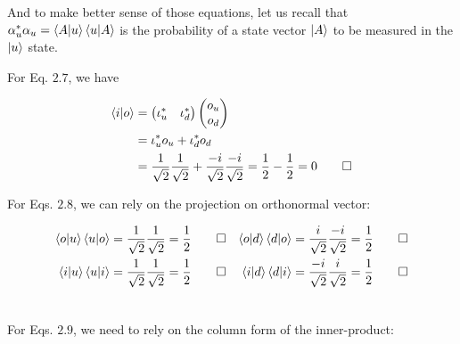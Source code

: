 \documentclass[solutions.tex]{subfiles}
\begin{document}
And to make better sense of those equations, let us recall
that $\alpha_u^*\alpha_u = \left\langle A \middle| u \right\rangle\left\langle u \middle| A \right\rangle$ is the
probability of a state vector $|A\rangle$ to be measured in the
$|u\rangle$ state.

For Eq. $2.7$, we have

\begin{align*}
\left\langle i \middle| o \right\rangle &=
\begin{pmatrix}
\iota_u^* & \iota_d^* \\
\end{pmatrix}
\begin{pmatrix}
o_u \\
o_d \\
\end{pmatrix} \\
~ &= \iota_u^*o_u + \iota_d^*o_d \\
~ &= \frac1{\sqrt2}\frac1{\sqrt2} + \frac{-i}{\sqrt2}\frac{-i}{\sqrt2}
 = \frac1{2}-\frac{1}{2} = 0 \qed \\
\end{align*}

For Eqs. $2.8$, we can rely on the projection on orthonormal vector:

\begin{align*}
\left\langle o \middle| u \right\rangle\left\langle u \middle| o \right\rangle &= \frac1{\sqrt2}\frac1{\sqrt2}
= \frac1{2} \qed &
\left\langle o \middle| d \right\rangle\left\langle d \middle| o \right\rangle &= \frac{i}{\sqrt2}\frac{-i}{\sqrt2}
= \frac1{2} \qed \\
\left\langle i \middle| u \right\rangle\left\langle u \middle| i \right\rangle &= \frac1{\sqrt2}\frac1{\sqrt2}
= \frac1{2} \qed &
\left\langle i \middle| d \right\rangle\left\langle d \middle| i \right\rangle &= \frac{-i}{\sqrt2}\frac{i}{\sqrt2}
= \frac1{2} \qed \\
~ & ~ \\
\end{align*}

For Eqs. $2.9$, we need to rely on the column form of the inner-product:
\end{document}
